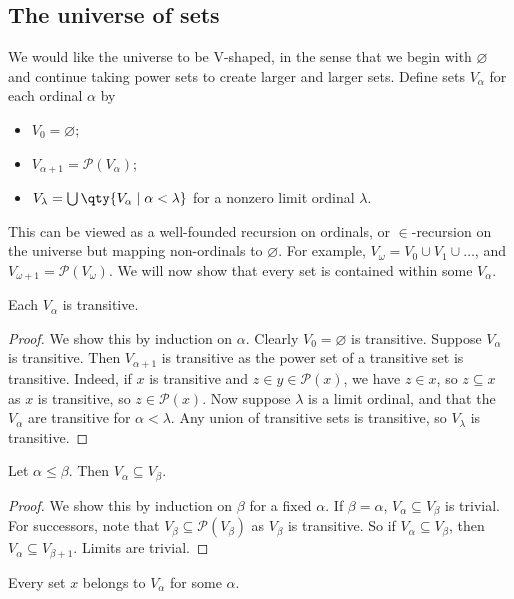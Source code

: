 \subsection{The universe of sets}
We would like the universe to be V-shaped, in the sense that we begin with $\varnothing$ and continue taking power sets to create larger and larger sets.
Define sets $V_\alpha$ for each ordinal $\alpha$ by
\begin{itemize}
    \item $V_0 = \varnothing$;
    \item $V_{\alpha+1} = \mathcal P(V_\alpha)$;
    \item $V_\lambda = \bigcup \qty{V_\alpha \mid \alpha < \lambda}$ for a nonzero limit ordinal $\lambda$.
\end{itemize}
This can be viewed as a well-founded recursion on ordinals, or $\in$-recursion on the universe but mapping non-ordinals to $\varnothing$.
For example, $V_\omega = V_0 \cup V_1 \cup \dots$, and $V_{\omega+1} = \mathcal P(V_\omega)$.
We will now show that every set is contained within some $V_\alpha$.
\begin{lemma}
    Each $V_\alpha$ is transitive.
\end{lemma}
\begin{proof}
    We show this by induction on $\alpha$.
    Clearly $V_0 = \varnothing$ is transitive.
    Suppose $V_\alpha$ is transitive.
    Then $V_{\alpha+1}$ is transitive as the power set of a transitive set is transitive.
    Indeed, if $x$ is transitive and $z \in y \in \mathcal P(x)$, we have $z \in x$, so $z \subseteq x$ as $x$ is transitive, so $z \in \mathcal P(x)$.
    Now suppose $\lambda$ is a limit ordinal, and that the $V_\alpha$ are transitive for $\alpha < \lambda$.
    Any union of transitive sets is transitive, so $V_\lambda$ is transitive.
\end{proof}
\begin{lemma}
    Let $\alpha \leq \beta$.
    Then $V_\alpha \subseteq V_\beta$.
\end{lemma}
\begin{proof}
    We show this by induction on $\beta$ for a fixed $\alpha$.
    If $\beta = \alpha$, $V_\alpha \subseteq V_\beta$ is trivial.
    For successors, note that $V_\beta \subseteq \mathcal P(V_\beta)$ as $V_\beta$ is transitive.
    So if $V_\alpha \subseteq V_\beta$, then $V_\alpha \subseteq V_{\beta+1}$.
    Limits are trivial.
\end{proof}
\begin{theorem}
    Every set $x$ belongs to $V_\alpha$ for some $\alpha$.
\end{theorem}
